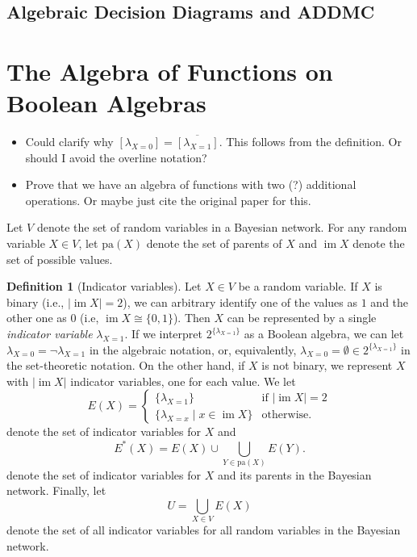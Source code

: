 \documentclass{article}
\theoremstyle{definition}
\newtheorem{definition}{Definition}
\theoremstyle{remark}
\DeclareMathOperator{\im}{im}
\begin{document}
\subsection{Algebraic Decision Diagrams and ADDMC}

\section{The Algebra of Functions on Boolean Algebras}

\begin{itemize}
\item Could clarify why $[\lambda_{X=0}] = \overline{[\lambda_{X=1}]}$. This
  follows from the definition. Or should I avoid the overline notation?
\item Prove that we have an algebra of functions with two (?) additional
  operations. Or maybe just cite the original paper for this.
\end{itemize}

Let $V$ denote the set of random variables in a Bayesian network. For any random
variable $X \in V$, let $\mathrm{pa}(X)$ denote the set of parents of $X$ and
$\im X$ denote the set of possible values.

\begin{definition}[Indicator variables]
  Let $X \in V$ be a random variable. If $X$ is binary (i.e., $|\im X| = 2$), we
  can arbitrary identify one of the values as $1$ and the other one as $0$ (i.e,
  $\im X \cong \{ 0, 1 \}$). Then $X$ can be represented by a single
  \emph{indicator variable} $\lambda_{X=1}$. If we interpret
  $2^{\{\lambda_{X=1}\}}$ as a Boolean algebra, we can let $\lambda_{X=0} =
  \neg\lambda_{X=1}$ in the algebraic notation, or, equivalently, $\lambda_{X=0}
  = \emptyset \in 2^{\{\lambda_{X=1}\}}$ in the set-theoretic notation. On the
  other hand, if $X$ is not binary, we represent $X$ with $|\im X|$ indicator
  variables, one for each value. We let
  \[
    E(X) = \begin{cases}
      \{ \lambda_{X=1} \} & \text{if } |\im X| = 2 \\
      \{ \lambda_{X=x} \mid x \in \im X \} & \text{otherwise.}
    \end{cases}
  \]
  denote the set of indicator variables for $X$ and
  \[
    E^*(X) = E(X) \cup \bigcup_{Y \in \mathrm{pa}(X)} E(Y).
  \]
  denote the set of indicator variables for $X$ and its parents in the Bayesian
  network. Finally, let
  \[
    U = \bigcup_{X \in V} E(X)
  \]
  denote the set of all indicator variables for all random variables in the
  Bayesian network.
\end{definition}
\end{document}
